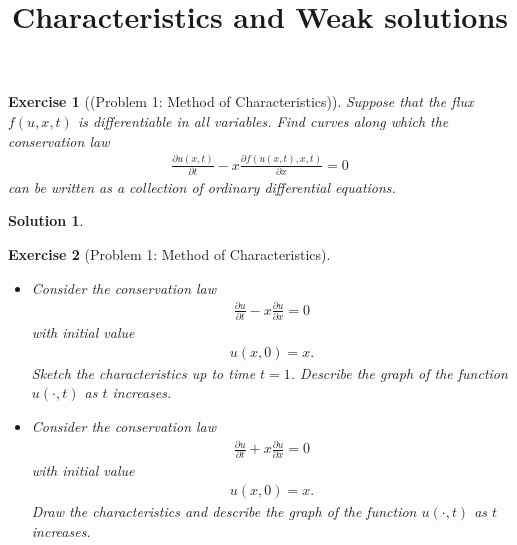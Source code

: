 \documentclass[10pt,letterpaper]{article}
\theoremstyle{break}
\newtheorem{exercise}{Exercise}
\newtheorem{solution}{Solution}
\begin{document}
\title{Characteristics and Weak solutions}
\date{}




















\begin{exercise}[(Problem 1: Method of Characteristics)]

	Suppose that the flux $f(u,x,t)$ is differentiable in all variables.
	Find curves along which the conservation law 
	\begin{align}
		\frac{\partial u(x,t)}{\partial t}
		-
		x
		\frac{\partial f(u(x,t),x,t)}{\partial x}
		= 0
	\end{align}
	can be written as a collection of ordinary differential equations.
\end{exercise}

\begin{solution}
	
\end{solution}
	











\begin{exercise}[Problem 1: Method of Characteristics]
	${}$%
	\begin{itemize}
	\item[(i)] Consider the conservation law 
	\begin{align}
		\frac{\partial u}{\partial t}
		-
		x
		\frac{\partial u}{\partial x}
		= 0
	\end{align}
	with initial value
	\begin{align}
		u(x,0)=x.
	\end{align}
	Sketch the characteristics up to time $t=1$. Describe the graph of the function $u(\cdot,t)$
	as $t$ increases.
	\item[(ii)] Consider the conservation law
	\begin{align}
		\frac{\partial u}{\partial t}
		+
		x
		\frac{\partial u}{\partial x}
		= 0
	\end{align}
	with initial value
	\begin{align}
		u(x,0)=x.
	\end{align}
	Draw the characteristics and describe the graph of the function $u(\cdot,t)$ as $t$ increases.
	\end{itemize}
\end{exercise}
\end{document}
